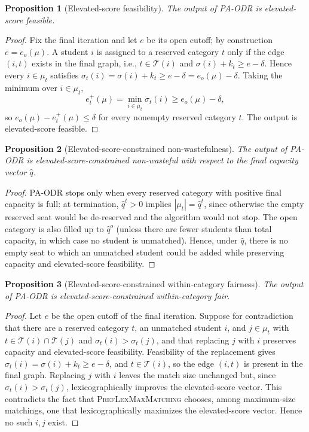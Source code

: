 \documentclass[10pt]{article}
\newtheorem{proposition}{Proposition}
\newcommand{\T}{\mathcal{T}}
\newcommand{\1}{\mathbf{1}}
\begin{document}
\begin{proposition}[Elevated-score feasibility]
\label{prop:pa-odr-score-feasible}
The output of PA-ODR is elevated-score feasible.
\end{proposition}

\begin{proof}
Fix the final iteration and let $e$ be its open cutoff; by construction $e=e_o(\mu)$. A student $i$ is assigned to a reserved category $t$ only if the edge $(i,t)$ exists in the final graph, i.e., $t\in\T(i)$ and $\sigma(i)+k_t\ge e-\delta$. Hence every $i\in\mu_t$ satisfies $\sigma_t(i)=\sigma(i)+k_t\ge e-\delta=e_o(\mu)-\delta$. Taking the minimum over $i\in\mu_t$,
\[
e_t^+(\mu)=\min_{i\in\mu_t}\sigma_t(i)\ge e_o(\mu)-\delta,
\]
so $e_o(\mu)-e_t^+(\mu)\le\delta$ for every nonempty reserved category $t$. The output is elevated-score feasible.
\end{proof}

\begin{proposition}[Elevated-score-constrained non-wastefulness]
\label{prop:pa-odr-nonwaste}
The output of PA-ODR is elevated-score-constrained non-wasteful with respect to the final capacity vector $\hat q$.
\end{proposition}

\begin{proof}
PA-ODR stops only when every reserved category with positive final capacity is full: at termination, $\hat q^t>0$ implies $|\mu_t|=\hat q^t$, since otherwise the empty reserved seat would be de-reserved and the algorithm would not stop. The open category is also filled up to $\hat q^o$ (unless there are fewer students than total capacity, in which case no student is unmatched). Hence, under $\hat q$, there is no empty seat to which an unmatched student could be added while preserving capacity and elevated-score feasibility.
\end{proof}

\begin{proposition}[Elevated-score-constrained within-category fairness]
\label{prop:pa-odr-within}
The output of PA-ODR is elevated-score-constrained within-category fair.
\end{proposition}

\begin{proof}
Let $e$ be the open cutoff of the final iteration. Suppose for contradiction that there are a reserved category $t$, an unmatched student $i$, and $j\in\mu_t$ with $t\in\T(i)\cap\T(j)$ and $\sigma_t(i)>\sigma_t(j)$, and that replacing $j$ with $i$ preserves capacity and elevated-score feasibility. Feasibility of the replacement gives $\sigma_t(i)=\sigma(i)+k_t\ge e-\delta$, and $t\in\T(i)$, so the edge $(i,t)$ is present in the final graph. Replacing $j$ with $i$ leaves the match size unchanged but, since $\sigma_t(i)>\sigma_t(j)$, lexicographically improves the elevated-score vector. This contradicts the fact that \textsc{PrefLexMaxMatching} chooses, among maximum-size matchings, one that lexicographically maximizes the elevated-score vector. Hence no such $i,j$ exist.
\end{proof}
\end{document}

